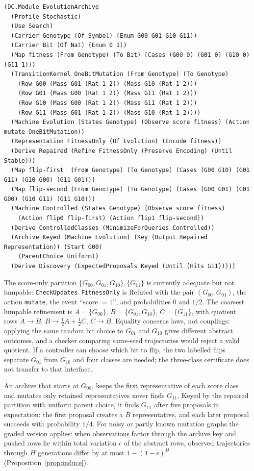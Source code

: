 \documentclass[11pt]{article}
\newcommand{\code}[1]{\texttt{#1}}
\theoremstyle{definition}
\theoremstyle{plain}
\begin{document}
\begin{lstlisting}[basicstyle=\ttfamily\footnotesize,title={\scriptsize\ttfamily fixtures/evolution\_archive.metta}]
(DC.Module EvolutionArchive
  (Profile Stochastic)
  (Use Search)
  (Carrier Genotype (Of Symbol) (Enum G00 G01 G10 G11))
  (Carrier Bit (Of Nat) (Enum 0 1))
  (Map fitness (From Genotype) (To Bit) (Cases (G00 0) (G01 0) (G10 0) (G11 1)))
  (TransitionKernel OneBitMutation (From Genotype) (To Genotype)
    (Row G00 (Mass G01 (Rat 1 2)) (Mass G10 (Rat 1 2)))
    (Row G01 (Mass G00 (Rat 1 2)) (Mass G11 (Rat 1 2)))
    (Row G10 (Mass G00 (Rat 1 2)) (Mass G11 (Rat 1 2)))
    (Row G11 (Mass G01 (Rat 1 2)) (Mass G10 (Rat 1 2))))
  (Machine Evolution (States Genotype) (Observe score fitness) (Action mutate OneBitMutation))
  (Representation FitnessOnly (Of Evolution) (Encode fitness))
  (Derive Repaired (Refine FitnessOnly (Preserve Encoding) (Until Stable)))
  (Map flip-first  (From Genotype) (To Genotype) (Cases (G00 G10) (G01 G11) (G10 G00) (G11 G01)))
  (Map flip-second (From Genotype) (To Genotype) (Cases (G00 G01) (G01 G00) (G10 G11) (G11 G10)))
  (Machine Controlled (States Genotype) (Observe score fitness)
    (Action flip0 flip-first) (Action flip1 flip-second))
  (Derive ControlledClasses (MinimizeForQueries Controlled))
  (Archive Keyed (Machine Evolution) (Key (Output Repaired Representation)) (Start G00)
    (ParentChoice Uniform))
  (Derive Discovery (ExpectedProposals Keyed (Until (Hits G11)))))
\end{lstlisting}

The score-only partition $\{G_{00},G_{01},G_{10}\},\{G_{11}\}$ is currently adequate but not
lumpable: \code{CheckUpdates FitnessOnly} is Refuted with the pair $(G_{00},G_{01})$, the action
\code{mutate}, the event ``score $=1$'', and probabilities $0$ and $1/2$. The coarsest lumpable
refinement is $A=\{G_{00}\}$, $B=\{G_{01},G_{10}\}$, $C=\{G_{11}\}$, with quotient rows $A\to B$,
$B\to\tfrac12A+\tfrac12C$, $C\to B$. Equality concerns laws, not couplings: applying the same random
bit choice to $G_{01}$ and $G_{10}$ gives different abstract outcomes, and a checker comparing
same-seed trajectories would reject a valid quotient. If a controller can choose which bit to flip,
the two labelled flips separate $G_{01}$ from $G_{10}$ and four classes are needed; the three-class
certificate does not transfer to that interface.

An archive that starts at $G_{00}$, keeps the first representative of each score class and mutates
only retained representatives never finds $G_{11}$. Keyed by the repaired partition with uniform
parent choice, it finds $G_{11}$ after five proposals in expectation: the first proposal creates a
$B$ representative, and each later proposal succeeds with probability $1/4$. For noisy or partly
known mutation graphs the graded version applies: when observations factor through the archive key
and pushed rows lie within total variation $\epsilon$ of the abstract rows, observed trajectories
through $H$ generations differ by at most $1-(1-\epsilon)^H$ (Proposition~\ref{prop:induce}).
\end{document}
